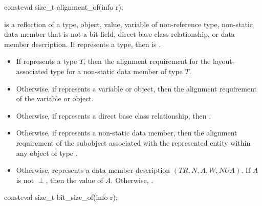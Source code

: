 %
\begin{itemdecl}
consteval size_t alignment_of(info r);
\end{itemdecl}

\begin{itemdescr}
\pnum
\constantwhen
{} is a reflection of a
type,
object,
value,
variable of non-reference type,
non-static data member that is not a bit-field,
direct base class relationship, or
data member description.
If  represents a type,
then  is .

\pnum
\returns
\begin{itemize}
\item
  If  represents a type $T$,
  then the alignment requirement for the layout-associated type
  for a non-static data member of type $T$.
\item
  Otherwise, if  represents a variable or object,
  then the alignment requirement of the variable or object.
\item
  Otherwise, if  represents a direct base class relationship,
  then .
\item
  Otherwise, if  represents a non-static data member,
  then the alignment requirement of the subobject
  associated with the represented entity
  within any object of type .
\item
  Otherwise,  represents a data member description
  $(\mathit{TR}, N, A, W, \mathit{NUA})$.
  If $A$ is not $\perp$,
  then the value of $A$.
  Otherwise, .
\end{itemize}
\end{itemdescr}

%
\begin{itemdecl}
consteval size_t bit_size_of(info r);
\end{itemdecl}

